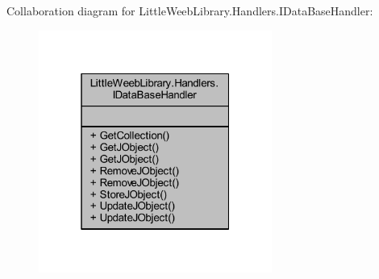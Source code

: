 Collaboration diagram for Little\+Weeb\+Library.\+Handlers.\+I\+Data\+Base\+Handler\+:\nopagebreak
\begin{figure}[H]
\begin{center}
\leavevmode
\includegraphics[width=217pt]{interface_little_weeb_library_1_1_handlers_1_1_i_data_base_handler__coll__graph}
\end{center}
\end{figure}
